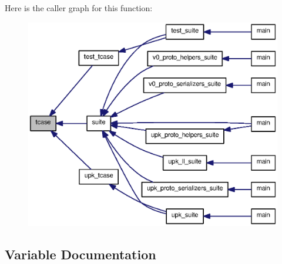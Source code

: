 Here is the caller graph for this function:\nopagebreak
\begin{figure}[H]
\begin{center}
\leavevmode
\includegraphics[width=400pt]{tskel_8c_a8a435d719d867659f07d654e35407fa4_icgraph}
\end{center}
\end{figure}




\subsection{Variable Documentation}
\subsubsection[{END\_\-TEST}]{}\label{tskel_8c_a458b78ce9e48beb128edb722b07e4716}
